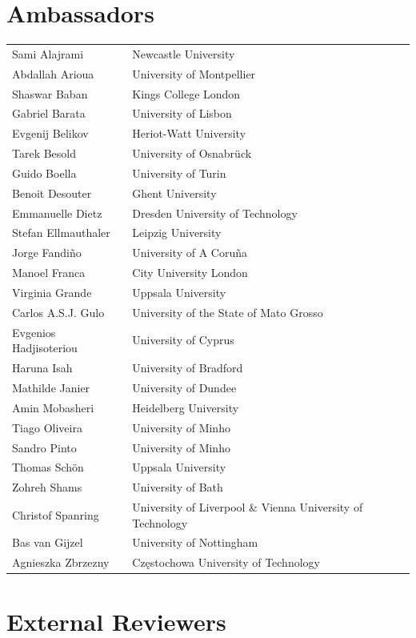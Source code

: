 \documentclass[a4paper,UKenglish]{oasicsmaster}
\begin{document}
\section*{Ambassadors}

\begin{tabularx}{\textwidth}{p{}l}
Sami Alajrami		& Newcastle University\\
Abdallah Arioua 	& University of Montpellier\\
Shaswar Baban 		& Kings College London\\
Gabriel Barata		& University of Lisbon\\
Evgenij Belikov 	& Heriot-Watt University\\
Tarek Besold		& University of Osnabr\"{u}ck\\
Guido Boella 		& University of Turin\\
Benoit Desouter		& Ghent University\\
Emmanuelle Dietz	& Dresden University of Technology\\
Stefan Ellmauthaler 	& Leipzig University\\
Jorge Fandi\~{n}o	& University of A Coru\~{n}a\\
Manoel Franca		& City University London\\
Virginia Grande		& Uppsala University\\
Carlos A.S.J. Gulo	& University of the State of Mato Grosso\\
Evgenios Hadjisoteriou 	& University of Cyprus\\
Haruna Isah		& University of Bradford\\
Mathilde Janier		& University of Dundee\\
Amin Mobasheri 		& Heidelberg University\\
Tiago Oliveira		& University of Minho\\
Sandro Pinto 		& University of Minho\\
Thomas Sch\"{o}n 	& Uppsala University\\
Zohreh Shams 		& University of Bath\\
Christof Spanring 	& University of Liverpool \& Vienna University of Technology\\
Bas van Gijzel 		& University of Nottingham\\
Agnieszka Zbrzezny 	& Cz\k{e}stochowa University of Technology\\
\end{tabularx}
\newpage

\section*{External Reviewers}
\end{document}
